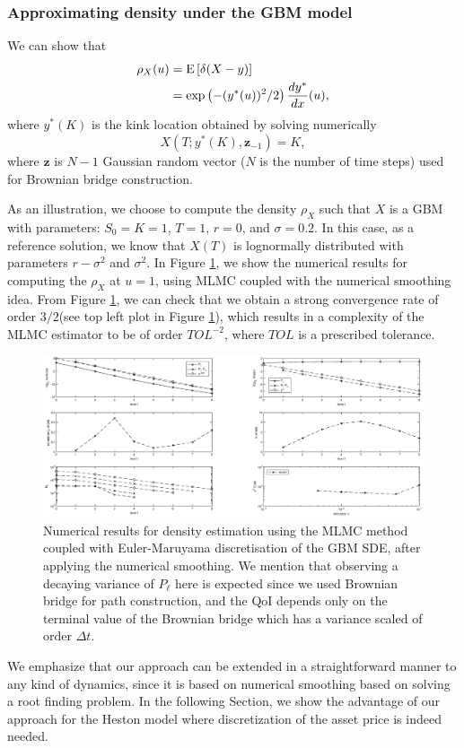 \subsubsection{Approximating density under the GBM model}\label{sec:Approximating density under the GBM model}

We can show that 
\begin{align}
\rho_{X}(u)&=\mathrm{E}\left[\delta(X-y)\right]\nonumber\\
&=\exp\left(-(y^\ast(u))^2/2\right) \frac{d y^\ast}{dx}(u),
\end{align}
where $y^\ast(K)$ is the kink location obtained by solving numerically 
$$X(T; y^\ast(K), \mathbf{z}_{-1})=K,$$
where  $\mathbf{z}$ is $N-1$ Gaussian random  vector ($N$ is the number of time steps) used for Brownian bridge construction.

As an illustration, we choose to compute the density $\rho_{X}$  such that $X$ is a GBM with parameters: $S_0=K=1$, $T=1$, $r=0$, and $\sigma=0.2$. In this case, as a reference solution,  we know that $X(T)$ is lognormally distributed with parameters $r-\sigma^2$ and $\sigma^2$. In Figure \ref{fig:euler_density_MLMC_with_smoothing}, we show the numerical results  for computing the $\rho_{X}$ at $u=1$, using  MLMC coupled with the numerical smoothing idea. From Figure \ref{fig:euler_density_MLMC_with_smoothing}, we can check that we obtain a strong convergence rate of order $3/2$(see  top left plot in Figure \ref{fig:euler_density_MLMC_with_smoothing}), which results in a complexity of the MLMC estimator to be of order $TOL^{-2}$, where $TOL$ is a prescribed tolerance.
\FloatBarrier
	\begin{figure}[h!]
\centering
\includegraphics[width=1.2\linewidth]{./figures/MLMC_density_GBM_estimation/density_L0_2_L_8.eps}

\caption{Numerical results for  density estimation  using the MLMC method coupled with Euler-Maruyama discretisation of the GBM SDE, after applying  the numerical smoothing. We mention that observing a decaying variance of $P_{\ell}$ here is expected since we used Brownian bridge for path construction, and the QoI depends only on the terminal value of the Brownian bridge which has a variance scaled of order $\Delta t$.}
\label{fig:euler_density_MLMC_with_smoothing}
\end{figure}
\FloatBarrier
We emphasize that our approach can be extended in a straightforward manner to any kind of dynamics, since it is based on numerical smoothing based on solving a root finding problem.  In the following Section, we show the advantage of our approach for the Heston model where discretization of the asset price is indeed needed.

